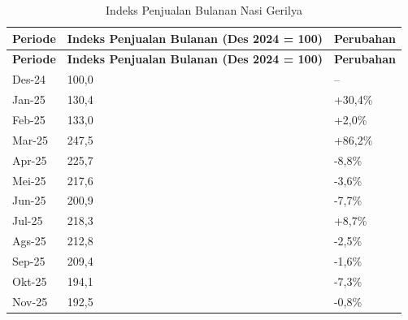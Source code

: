 \begingroup
\begin{xltabular}{\textwidth}{|Y|C{6.5cm}|C{3.5cm}|}
\caption{Indeks Penjualan Bulanan Nasi Gerilya}
\label{tab:jumlah_penjualan_bungkus_grabfood} \\
        \toprule
        \textbf{Periode} & \textbf{Indeks Penjualan Bulanan (Des 2024 = 100)} & \textbf{Perubahan} \\ \hline
        \midrule
\endfirsthead
{}
        \toprule
        \textbf{Periode} & \textbf{Indeks Penjualan Bulanan (Des 2024 = 100)} & \textbf{Perubahan} \\ \hline
        \midrule
\endhead
{}
\endfoot
        \bottomrule
        \endlastfoot
        Des-24           & 100,0                               & --                 \\ \hline
        Jan-25           & 130,4                               & +30,4\%            \\ \hline
        Feb-25           & 133,0                               & +2,0\%             \\ \hline
        Mar-25           & 247,5                               & +86,2\%            \\ \hline
        Apr-25           & 225,7                               & -8,8\%             \\ \hline
        Mei-25           & 217,6                               & -3,6\%             \\ \hline
        Jun-25           & 200,9                               & -7,7\%             \\ \hline
        Jul-25           & 218,3                               & +8,7\%             \\ \hline
        Ags-25           & 212,8                               & -2,5\%             \\ \hline
        Sep-25           & 209,4                               & -1,6\%             \\ \hline
        Okt-25           & 194,1                               & -7,3\%             \\ \hline
        Nov-25           & 192,5                               & -0,8\%             \\ \hline
        \bottomrule
    
\end{xltabular}
\endgroup

